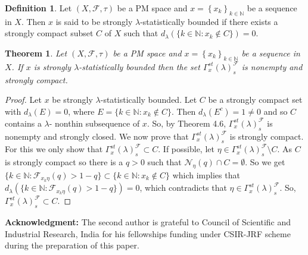 \documentclass[reqno,b5paper]{amsart}
\theoremstyle{plain}
\newtheorem{thm}{Theorem}[section]
\theoremstyle{definition}
\newtheorem{defn}{Definition}[section]
\begin{document}
\begin{defn}
Let $(X,\mathcal{F},\tau)$ be a PM space and
$x=\left\{x_{k}\right\}_{k\in\mathbb N}$ be a sequence in $X$.
Then $x$ is said to be strongly $\lambda$-statistically bounded if
there exists a strongly compact subset $C$ of $X$ such that
$d_\lambda(\{k\in\mathbb{N}:x_k\notin C\})=0$.
\end{defn}
\begin{thm}
Let $(X,\mathcal{F},\tau)$ be a PM space and
$x=\left\{x_{k}\right\}_{k\in\mathbb N}$ be a sequence in $X$. If
$x$ is strongly $\lambda$-statistically bounded then the set
$\Gamma_x^{st}(\lambda)^\mathcal{F}_{s}$ is nonempty and strongly
compact.
\end{thm}
\begin{proof}
Let $x$ be strongly $\lambda$-statistically bounded. Let $C$ be a
strongly compact set with $d_\lambda(E)=0$, where
$E=\{k\in\mathbb{N}:x_k\notin C\}$. Then $d_\lambda(E^c)=1\neq 0$
and so $C$ contains a $\lambda$- nonthin subsequence of $x$. So,
by Theorem 4.6, $\Gamma_x^{st}(\lambda)^\mathcal{F}_{s}$ is
nonempty and strongly closed. We now prove that
$\Gamma_x^{st}(\lambda)^\mathcal{F}_{s}$ is strongly compact. For
this we only show that
$\Gamma_x^{st}(\lambda)^\mathcal{F}_{s}\subset C$. If possible,
let $\eta\in \Gamma_x^{st}(\lambda)^\mathcal{F}_{s}\setminus C$.
As $C$ is strongly compact so there is a $q>0$ such that
$\mathcal{N}_\eta(q)\cap C=\emptyset$. So we get
$\{k\in\mathbb{N}:\mathcal{F}_{x_k\eta}(q)>1-q\}\subset\{k\in\mathbb{N}:x_k\notin
C\}$ which implies that
$d_\lambda(\{k\in\mathbb{N}:\mathcal{F}_{x_k\eta}(q)>1-q\})=0$,
which contradicts that
$\eta\in\Gamma_x^{st}(\lambda)^\mathcal{F}_{s}$. So,
$\Gamma_x^{st}(\lambda)^\mathcal{F}_{s}\subset C$.
\end{proof}
\noindent\textbf{Acknowledgment:} The second author is grateful to
Council of Scientific and Industrial Research, India for his
fellowships funding under CSIR-JRF scheme during the preparation
of this paper.
\\
\end{document}
